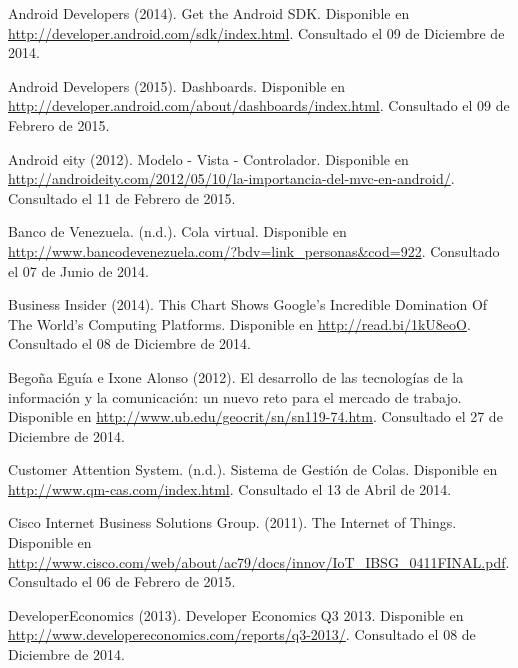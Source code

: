 \begin{spacing}{1.0}
\begin{thebibliography}{99}
\newblock Android Developers (2014).
\newblock Get the Android SDK.
\newblock Disponible en \url{http://developer.android.com/sdk/index.html}.
\newblock Consultado el 09 de Diciembre de 2014.

\newblock Android Developers (2015).
\newblock Dashboards.
\newblock Disponible en \url{http://developer.android.com/about/dashboards/index.html}.
\newblock Consultado el 09 de Febrero de 2015.

\newblock Android eity (2012).
\newblock Modelo - Vista - Controlador.
\newblock Disponible en \url{http://androideity.com/2012/05/10/la-importancia-del-mvc-en-android/}.
\newblock Consultado el 11 de Febrero de 2015.






\newblock Banco de Venezuela. (n.d.).
\newblock Cola virtual.
\newblock Disponible en \url{http://www.bancodevenezuela.com/?bdv=link_personas&cod=922}.
\newblock Consultado el 07 de Junio de 2014.

\newblock Business Insider  (2014).
\newblock This Chart Shows Google's Incredible Domination Of The World's Computing Platforms.
\newblock Disponible en \url{http://read.bi/1kU8eoO}.
\newblock Consultado el 08 de Diciembre de 2014.

\newblock Begoña Eguía e Ixone Alonso (2012).
\newblock El desarrollo de las tecnologías de la información y la comunicación: un nuevo reto para el mercado de trabajo. 
\newblock Disponible en \url{http://www.ub.edu/geocrit/sn/sn119-74.htm}.
\newblock Consultado el 27 de Diciembre de 2014.



\newblock Customer Attention System. (n.d.).
\newblock Sistema de Gestión de Colas.
\newblock Disponible en \url{http://www.qm-cas.com/index.html}.
\newblock Consultado el 13 de Abril de 2014.

\newblock Cisco Internet Business Solutions Group. (2011).
\newblock The Internet of Things. 
\newblock Disponible en \url{http://www.cisco.com/web/about/ac79/docs/innov/IoT_IBSG_0411FINAL.pdf}.
\newblock Consultado el 06 de Febrero de 2015.





\newblock DeveloperEconomics  (2013).
\newblock Developer Economics Q3 2013.
\newblock Disponible en \url{http://www.developereconomics.com/reports/q3-2013/}.
\newblock Consultado el 08 de Diciembre de 2014.





\end{thebibliography}
\end{spacing}
